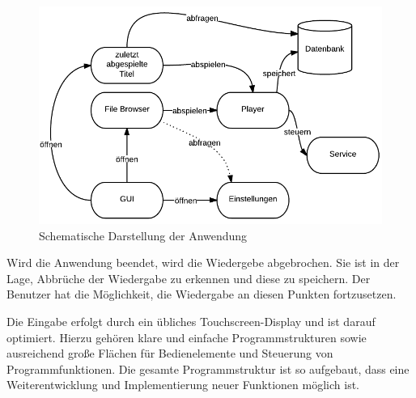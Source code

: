 \begin{figure}
\begin{center}
\includegraphics[scale=0.6]{images/konzept}
\caption{Schematische Darstellung der Anwendung}
\label{konzept}
\end{center}
\end{figure}

Wird die Anwendung beendet, wird die Wiedergebe abgebrochen. Sie ist in der Lage, Abbrüche der Wiedergabe zu erkennen und diese zu speichern. Der Benutzer hat die Möglichkeit, die Wiedergabe an diesen Punkten fortzusetzen.

Die Eingabe erfolgt durch ein übliches Touchscreen-Display und ist darauf optimiert. Hierzu gehören klare und einfache Programmstrukturen sowie ausreichend große Flächen für Bedienelemente und Steuerung von Programmfunktionen. Die gesamte Programmstruktur ist so aufgebaut, dass eine Weiterentwicklung und Implementierung neuer Funktionen möglich ist.